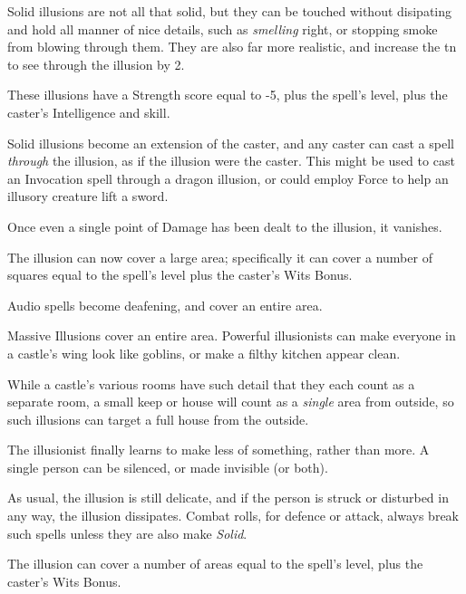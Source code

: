 \documentclass[titlepage,a4paper,openany]{book}
\begin{document}
\begin{multicols}{2}

Solid illusions are not all that solid, but they can be touched without disipating and hold all manner of nice details, such as \emph{smelling} right, or stopping smoke from blowing through them.  They are also far more realistic, and increase the \gls{tn} to see through the illusion by 2.

These illusions have a Strength score equal to -5, plus the spell's level, plus the caster's Intelligence and skill.

Solid illusions become an extension of the caster, and any caster can cast a spell \textit{through} the illusion, as if the illusion were the caster.  This might be used to cast an Invocation spell through a dragon illusion, or could employ Force to help an illusory creature lift a sword.

Once even a single point of Damage has been dealt to the illusion, it vanishes.


The illusion can now cover a large area; specifically it can cover a number of squares equal to the spell's level plus the caster's Wits Bonus.

Audio spells become deafening, and cover an entire area.


Massive Illusions cover an entire area.  Powerful illusionists can make everyone in a castle's wing look like goblins, or make a filthy kitchen appear clean.

While a castle's various rooms have such detail that they each count as a separate room, a small keep or house will count as a \emph{single} area from outside, so such illusions can target a full house from the outside.


The illusionist finally learns to make less of something, rather than more.  A single person can be silenced, or made invisible (or both).

As usual, the illusion is still delicate, and if the person is struck or disturbed in any way, the illusion dissipates.  Combat rolls, for defence or attack, always break such spells unless they are also make \textit{Solid}.


The illusion can cover a number of areas equal to the spell's level, plus the caster's Wits Bonus.

\end{multicols}
\end{document}
